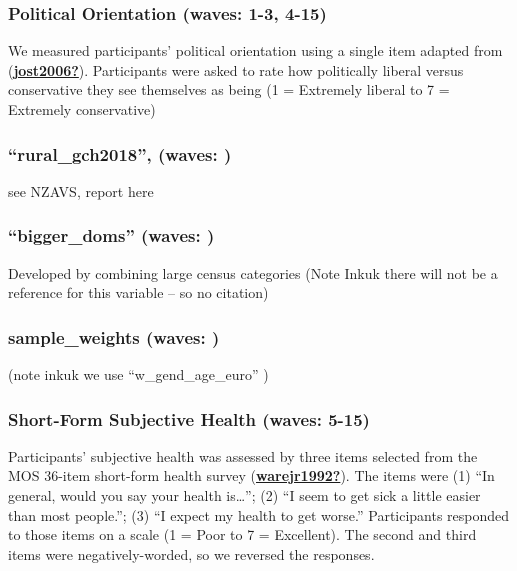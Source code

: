\documentclass[
  singlecolumn]{report}
\begin{document}
\hypertarget{political-orientation-waves-1-3-4-15}{%
\subsubsection{Political Orientation (waves: 1-3,
4-15)}\label{political-orientation-waves-1-3-4-15}}

We measured participants' political orientation using a single item
adapted from (\protect\hyperlink{ref-jost2006}{\textbf{jost2006?}}).
Participants were asked to rate how politically liberal versus
conservative they see themselves as being (1 = Extremely liberal to 7 =
Extremely conservative)

\hypertarget{rural_gch2018-waves}{%
\subsubsection{``rural\_gch2018'', (waves:
)}\label{rural_gch2018-waves}}

see NZAVS, report here

\hypertarget{bigger_doms-waves}{%
\subsubsection{``bigger\_doms'' (waves: )}\label{bigger_doms-waves}}

Developed by combining large census categories (Note Inkuk there will
not be a reference for this variable -- so no citation)

\hypertarget{sample_weights-waves}{%
\subsubsection{sample\_weights (waves: )}\label{sample_weights-waves}}

(note inkuk we use ``w\_gend\_age\_euro'' )

\hypertarget{short-form-subjective-health-waves-5-15}{%
\subsubsection{Short-Form Subjective Health (waves:
5-15)}\label{short-form-subjective-health-waves-5-15}}

Participants' subjective health was assessed by three items selected
from the MOS 36-item short-form health survey
(\protect\hyperlink{ref-warejr1992}{\textbf{warejr1992?}}). The items
were (1) ``In general, would you say your health is\ldots{}''; (2) ``I
seem to get sick a little easier than most people.''; (3) ``I expect my
health to get worse.'' Participants responded to those items on a scale
(1 = Poor to 7 = Excellent). The second and third items were
negatively-worded, so we reversed the responses.
\end{document}
